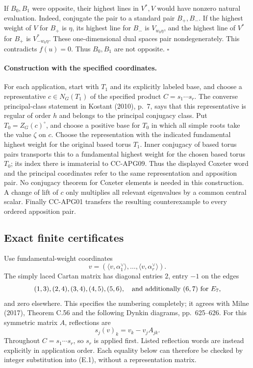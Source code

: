\documentclass[11pt,a4paper]{article}
\theoremstyle{definition}\newtheorem{definition}[theorem]{Definition}
\theoremstyle{remark}\newtheorem{remark}[theorem]{Remark}
\begin{document}
If \(B_0,B_1\) were opposite, their highest lines in \(V^*,V\)
would have nonzero natural evaluation. Indeed, conjugate the
pair to a standard pair \(B_+,B_-\). If the highest weight of
\(V\) for \(B_+\) is \(\eta\), its highest line for \(B_-\)
is \(V_{w_0\eta}\), and the highest line of \(V^*\) for \(B_+\)
is \(V^*_{-w_0\eta}\). These one-dimensional dual spaces pair
nondegenerately. This contradicts \(f(u)=0\).
Thus \(B_0,B_1\) are not opposite. \(\square\)

\paragraph{Construction with the specified coordinates.}
For each application, start with \(T_1\) and its explicitly labeled
base, and choose a representative \(c\in N_G(T_1)\) of the
specified product \(C=s_1\cdots s_r\). The converse principal-class
statement in Kostant (2010), p.~7, says that this representative
is regular of order \(h\) and belongs to the principal conjugacy
class. Put \(T_0=Z_G(c)^\circ\), and choose a positive base for
\(T_0\) in which all simple roots take the value \(\zeta\) on \(c\).
Choose the representation with the indicated fundamental highest
weight for the original based torus \(T_1\). Inner conjugacy of
based torus pairs transports this to a fundamental highest weight
for the chosen based torus \(T_0\); its index there is immaterial
to CC-APG09. Thus the displayed Coxeter word and the principal
coordinates refer to the same representation and apposition pair.
No conjugacy theorem for Coxeter elements is needed in this
construction. A change of lift of \(c\) only multiplies all relevant
eigenvalues by a common central scalar. Finally CC-APG01 transfers
the resulting counterexample to every ordered apposition pair.

\subsection{Exact finite certificates}

Use fundamental-weight coordinates
\[
       v=(\langle v,\alpha_1^\vee\rangle,\ldots,
                          \langle v,\alpha_r^\vee\rangle).
\]
The simply laced Cartan matrix has diagonal entries \(2\), entry
\(-1\) on the edges
\[
     (1,3),(2,4),(3,4),(4,5),(5,6),
          \quad\hbox{and additionally }(6,7)\hbox{ for }E_7,
\]
and zero elsewhere. This specifies the numbering completely;
it agrees with Milne (2017), Theorem C.56 and the following
Dynkin diagrams, pp.~625--626.
For this symmetric matrix \(A\), reflections are
\[
               s_j(v)_k=v_k-v_j A_{jk}.                 \tag{E.1}
\]
Throughout \(C=s_1\cdots s_r\), so \(s_r\) is applied first.
Listed reflection words are instead explicitly in application
order. Each equality below can therefore be checked by integer
substitution into (E.1), without a representation matrix.
\end{document}
